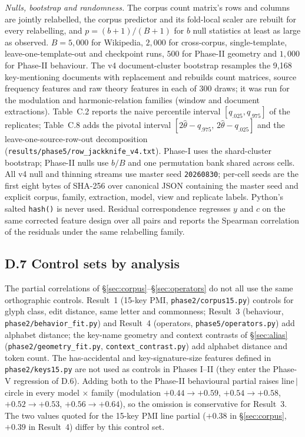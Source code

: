 \documentclass[11pt]{article}
\newcommand{\lc}{line$\,|\,$circle}
\begin{document}
\emph{Nulls, bootstrap and randomness.} The corpus count matrix's rows and columns are jointly relabelled, the corpus predictor and its fold-local scaler are rebuilt for every relabelling, and $p=(b+1)/(B+1)$ for $b$ null statistics at least as large as observed. $B=5{,}000$ for Wikipedia, $2{,}000$ for cross-corpus, single-template, leave-one-template-out and checkpoint runs, $500$ for Phase-II geometry and $1{,}000$ for Phase-II behaviour. The v4 document-cluster bootstrap resamples the 9,168 key-mentioning documents with replacement and rebuilds count matrices, source frequency features and raw theory features in each of 300 draws; it was run for the modulation and harmonic-relation families (window and document extractions). Table~C.2 reports the naive percentile interval $[q_{.025},q_{.975}]$ of the replicates; Table~C.8 adds the pivotal interval $[2\hat\theta-q_{.975},\,2\hat\theta-q_{.025}]$ and the leave-one-source-row-out decomposition (\texttt{results/phase5/row\_jackknife\_v4.txt}). Phase-I uses the shard-cluster bootstrap; Phase-II nulls use $b/B$ and one permutation bank shared across cells. All v4 null and thinning streams use master seed \texttt{20260830}; per-cell seeds are the first eight bytes of SHA-256 over canonical JSON containing the master seed and explicit corpus, family, extraction, model, view and replicate labels. Python's salted \mbox{\texttt{hash()}} is never used. Residual correspondence regresses $y$ and $c$ on the same corrected feature design over all pairs and reports the Spearman correlation of the residuals under the same relabelling family.

\subsection*{D.7 Control sets by analysis}
The partial correlations of \S\ref{sec:corpus}--\S\ref{sec:operators} do not all use the same orthographic controls. Result~1 (15-key PMI, \mbox{\texttt{phase2/corpus15.py}}) controls for glyph class, edit distance, same letter and commonness; Result~3 (behaviour, \mbox{\texttt{phase2/behavior\_fit.py}}) and Result~4 (operators, \mbox{\texttt{phase5/operators.py}}) add alphabet distance; the key-name geometry and context contrasts of \S\ref{sec:alias} (\mbox{\texttt{phase2/geometry\_fit.py}}, \texttt{context\_contrast.py}) add alphabet distance and token count. The has-accidental and key-signature-size features defined in \mbox{\texttt{phase2/keys15.py}} are not used as controls in Phases I--II (they enter the Phase-V regression of D.6). Adding both to the Phase-II behavioural partial raises \lc{} in every model $\times$ family (modulation $+0.44\to+0.59$, $+0.54\to+0.58$, $+0.52\to+0.53$, $+0.56\to+0.64$), so the omission is conservative for Result~3. The two values quoted for the 15-key PMI line partial ($+0.38$ in \S\ref{sec:corpus}, $+0.39$ in Result~4) differ by this control set.
\end{document}
